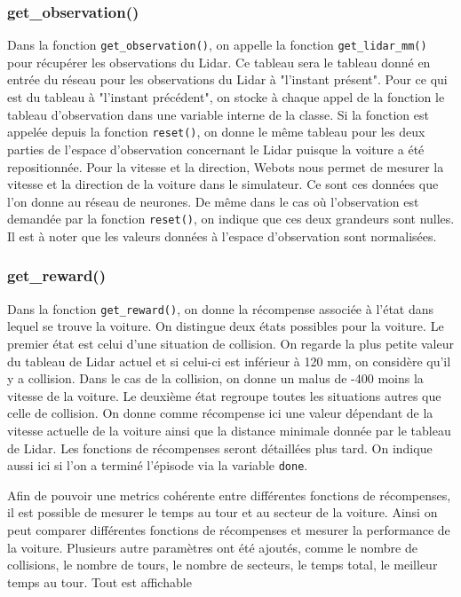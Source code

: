 \documentclass[french]{article}
\begin{document}
\subsubsection*{get\_observation()}
Dans la fonction \texttt{get\_observation()}, on appelle la fonction \texttt{get\_lidar\_mm()} pour récupérer 
les observations du Lidar. Ce tableau sera le tableau donné en entrée du réseau pour les observations du Lidar 
à "l'instant présent". Pour ce qui est du tableau à "l'instant précédent", on stocke à chaque appel de la 
fonction le tableau d'observation dans une variable interne de la classe. Si la fonction est appelée depuis 
la fonction \texttt{reset()}, on donne le même tableau pour les deux parties de l'espace d'observation concernant 
le Lidar puisque la voiture a été repositionnée. Pour la vitesse et la direction, Webots nous permet de mesurer 
la vitesse et la direction de la voiture dans le simulateur. Ce sont ces données que l'on donne au réseau de neurones. 
De même dans le cas où l'observation est demandée par la fonction \texttt{reset()}, on indique que ces deux grandeurs 
sont nulles. Il est à noter que les valeurs données à l'espace d'observation sont normalisées.

\subsubsection*{get\_reward()}

\label{subsec:reward}
Dans la fonction \texttt{get\_reward()}, on donne la récompense associée à l'état dans lequel se trouve la voiture. 
On distingue deux états possibles pour la voiture. Le premier état est celui d'une situation de collision. 
On regarde la plus petite valeur du tableau de Lidar actuel et si celui-ci est inférieur à 120 mm, on considère 
qu'il y a collision. Dans le cas de la collision, on donne un malus de -400 moins la vitesse de la voiture. 
Le deuxième état regroupe toutes les situations autres que celle de collision. On donne comme récompense ici 
une valeur dépendant de la vitesse actuelle de la voiture ainsi que la distance minimale donnée par le tableau de Lidar. 
Les fonctions de récompenses seront détaillées plus tard. On indique aussi ici si l'on a terminé l'épisode via la 
variable \texttt{done}.

Afin de pouvoir une metrics cohérente entre différentes fonctions de récompenses, il est possible de mesurer le temps au tour et au secteur de la voiture. Ainsi on peut comparer différentes fonctions de récompenses et mesurer la performance de la voiture. Plusieurs autre paramètres ont été ajoutés, comme le nombre de collisions, le nombre de tours, le nombre de secteurs, le temps total, le meilleur temps au tour. Tout est affichable 
\end{document}
